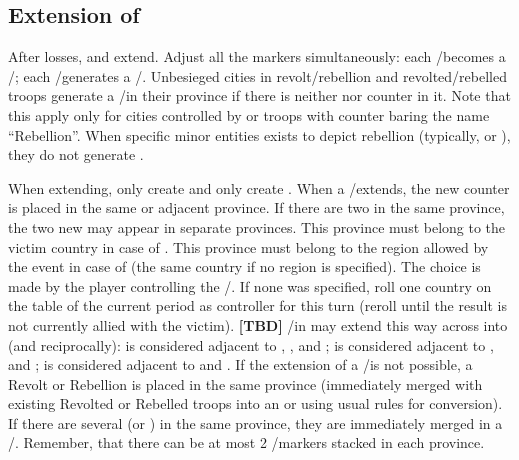 \subsection{Extension of \REVOLT}
\label{chRedep:Extension Revolts}
 After \STAB losses, \REVOLT and \REBELLION extend. Adjust
all the markers simultaneously:
\bparag each \REVOLT/\REBELLION\facemoins becomes a
\REVOLT/\REBELLION\faceplus;
\bparag each \REVOLT/\REBELLION\faceplus generates a
\REVOLT/\REBELLION\facemoins.
\bparag Unbesieged cities in revolt/rebellion and revolted/rebelled troops
generate a \REVOLT/\REBELLION\facemoins in their province if there is neither
\REVOLT nor \REBELLION counter in it.
\bparag Note that this apply only for cities controlled by or troops with
counter baring the name ``Rebellion''. When specific minor entities exists to
depict rebellion (typically,  or ), they do
not generate \REBELLION.

\bparag When extending, \REVOLT only create \REVOLT and \REBELLION only create
\REBELLION.
\bparag When a \REVOLT/\REBELLION\Faceplus extends, the new counter is placed 
in the same or adjacent province. If there are two \REVOLT\Faceplus in the
same province, the two new \REVOLT\Facemoins may appear in separate
provinces.
\bparag This province must belong to the victim country in case of \REVOLT.
\bparag This province must belong to the region allowed by the event in case
of \REBELLION (the same country if no region is specified).
\bparag The choice is made by the player controlling the
\REVOLT/\REBELLION. If none was specified, roll one country on the \REVOLT
table of the current period as controller for this turn (reroll until the
result is not currently allied with the victim).
\bparag \textbf{[TBD]} \REVOLT/\REBELLION in \regionIrlande may extend this
way across \seazoneMan into \ANG (and reciprocally): \provinceUlster is
considered adjacent to \provinceAlba, \provinceAyr, \provinceGalloway and
\provinceCumberland ; \provinceBrega is considered adjacent to
\provinceCumberland, \provinceLancashire and \provinceCymru ;
\provinceLeinster is considered adjacent to \provinceCymru and
\provinceCornwall.
\bparag If the extension of a \REVOLT/\REBELLION\faceplus is not possible, a
Revolt or Rebellion \LD is placed in the same province (immediately merged
with existing Revolted or Rebelled troops into an \ARMY\Facemoins or
\ARMY\Faceplus using usual rules for conversion).
\bparag If there are several \REVOLT\Facemoins (or \REBELLION\Facemoins) in
the same province, they are immediately merged in a
\REVOLT/\REBELLION\Faceplus.
\bparag Remember, that there can be at most 2 \REVOLT/\REBELLION markers
stacked in each province.

